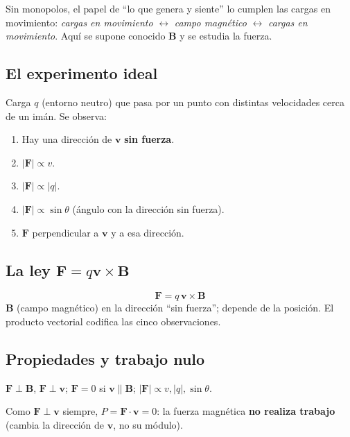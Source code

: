 \documentclass[12pt,a4paper]{article}
\begin{document}
Sin monopolos, el papel de \enquote{lo que genera y siente} lo cumplen
las cargas en movimiento: \emph{cargas en movimiento} $\leftrightarrow$
\emph{campo magnético} $\leftrightarrow$ \emph{cargas en movimiento}.
Aquí se supone conocido $\mathbf{B}$ y se estudia la fuerza.

\subsection{El experimento ideal}

Carga $q$ (entorno neutro) que pasa por un punto con distintas
velocidades cerca de un imán. Se observa:
\begin{enumerate}[nosep]
  \item Hay una dirección de $\mathbf{v}$ \textbf{sin fuerza}.
  \item $|\mathbf{F}| \propto v$.
  \item $|\mathbf{F}| \propto |q|$.
  \item $|\mathbf{F}| \propto \sin\theta$ (ángulo con la dirección sin
        fuerza).
  \item $\mathbf{F}$ perpendicular a $\mathbf{v}$ y a esa dirección.
\end{enumerate}

\subsection{La ley $\mathbf{F} = q\mathbf{v}\times\mathbf{B}$}

\begin{keybox}
  \[
  \boxed{\mathbf{F} = q\, \mathbf{v}\times\mathbf{B}}
  \]
  $\mathbf{B}$ (campo magnético) en la dirección \enquote{sin fuerza};
  depende de la posición. El producto vectorial codifica las cinco
  observaciones.
\end{keybox}

\subsection{Propiedades y trabajo nulo}

$\mathbf{F}\perp\mathbf{B}$, $\mathbf{F}\perp\mathbf{v}$; $\mathbf{F}=0$
si $\mathbf{v}\parallel\mathbf{B}$; $|\mathbf{F}|\propto v,|q|,\sin\theta$.

\begin{keybox}
  Como $\mathbf{F}\perp\mathbf{v}$ siempre, $P=\mathbf{F}\cdot\mathbf{v}=0$:
  la fuerza magnética \textbf{no realiza trabajo} (cambia la dirección de
  $\mathbf{v}$, no su módulo).
\end{keybox}
\end{document}
